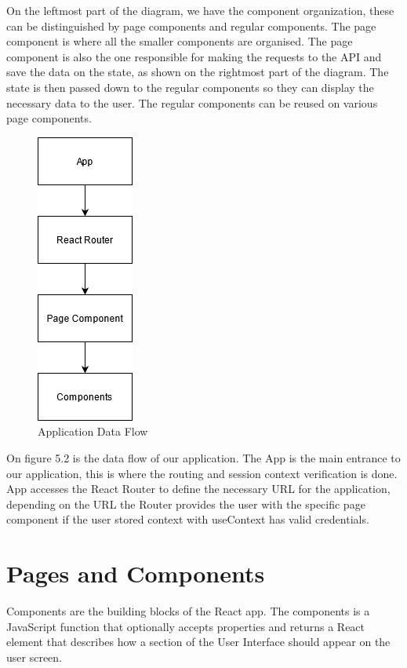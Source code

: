 \documentclass[a4paper,twoside,10pt]{report}
\begin{document}
On the leftmost part of the diagram, we have the component organization, these can be distinguished by page components and regular components.
The page component is where all the smaller components are organised. 
\newline
The page component is also the one responsible for making the requests to the API and save the data on the state, as shown on the rightmost part of the diagram.
\newline
The state is then passed down to the regular components so they can display the necessary data to the user.
The regular components can be reused on various page components.

\newpage
\begin{figure}[h!]
\center
    \includegraphics{client app interations.png}
\caption{Application Data Flow}
\end{figure}
On figure 5.2 is the data flow of our application.
The App is the main entrance to our application, this is where the routing and session context verification is done.
App accesses the React Router to define the necessary URL for the application, depending on the URL the Router provides the user with the specific page component if the user stored context with useContext has valid credentials.

\section{Pages and Components}
Components are the building blocks of the React app. The components is a JavaScript function that optionally accepts properties and returns a React element that describes how a section of the User Interface should appear on the user screen. 
\end{document}
